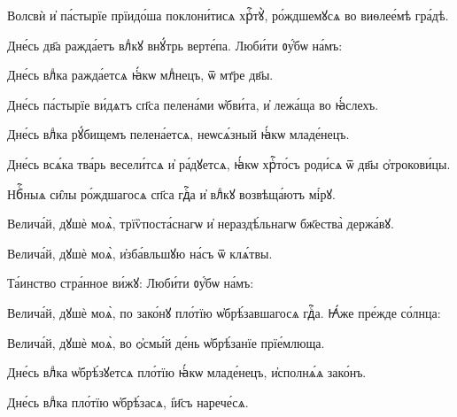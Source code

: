 \hKv Волсвѝ и҆ па́стырїе прїидо́ша поклони́тисѧ хрⷭ҇тꙋ̀,  ро́ждшемꙋсѧ во виѳлее́мѣ гра́дѣ. 


\hKv Дне́сь дв҃а ражда́етъ влⷣкꙋ внꙋ́трь верте́па. 
%
 Люби́ти ᲂу҆́бѡ на́мъ: 


\hKv Дне́сь влⷣка ражда́етсѧ ꙗ҆́кѡ млⷣнецъ, ѿ мт҃ре дв҃ы. 


\hKv Дне́сь па́стырїе ви́дѧтъ сп҃са пелена́ми ѡ҆бви́та, и҆  лежа́ща во ꙗ҆́слехъ. 

\hKv Дне́сь влⷣка рꙋ́бищемъ пелена́етсѧ, неѡсѧ́зный ꙗ҆́кѡ  младе́нецъ. 

\hKv Дне́сь всѧ́ка тва́рь весели́тсѧ и҆ ра́дꙋетсѧ, ꙗ҆́кѡ  хрⷭ҇то́съ роди́сѧ ѿ дв҃ы ѻ҆трокови́цы. 

\hKv Нбⷭ҇ныѧ си̑лы ро́ждшагосѧ сп҃са гдⷭ҇а и҆ влⷣкꙋ возвѣща́ютъ  мі́рꙋ. 
%

\hKv Велича́й, дꙋшѐ моѧ̀, трїѷпоста́снагѡ и҆ нераздѣ́льнагѡ  бж҃ества̀ держа́вꙋ. 
%

\hKv Велича́й, дꙋшѐ моѧ̀, и҆зба́вльшꙋю на́съ ѿ клѧ́твы. 

 Та́инство стра́нное ви́жꙋ: 
 Люби́ти  ᲂу҆́бѡ на́мъ:   


\hKv Велича́й, дꙋшѐ моѧ̀, по зако́нꙋ пло́тїю ѡ҆брѣ́завшагосѧ  гдⷭ҇а. 
%
 Ꙗ҆́же пре́жде со́лнца: 
%
%

\hKv Велича́й, дꙋшѐ моѧ̀, во ѻ҆смы́й де́нь ѡ҆брѣ́занїе  прїе́млюща. 

\hKv Дне́сь влⷣка ѡ҆брѣ́зꙋетсѧ пло́тїю ꙗ҆́кѡ младе́нецъ,  и҆сполнѧ́ѧ зако́нъ. 

\hKv Дне́сь влⷣка пло́тїю ѡ҆брѣ́засѧ, і҆и҃съ нарече́сѧ. 


